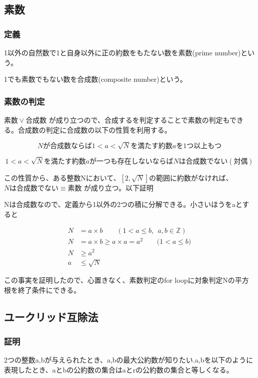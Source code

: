 \documentclass[dvipdfmx]{jsarticle}
\begin{document}
\subsection{素数}

\subsubsection{定義}

1以外の自然数で1と自身以外に正の約数をもたない数を素数(prime number)という。

1でも素数でもない数を合成数(composite number)という。

\subsubsection{素数の判定}

$素数 \lor 合成数$ が成り立つので、合成するを判定することで素数の判定もできる。合成数の判定に合成数の以下の性質を利用する。

\[Nが合成数 ならば 1 < a < \sqrt{N} を満たす約数aを1つ以上もつ\]

\[1 < a < \sqrt{N}を満たす約数aが一つも存在しない ならば　Nは合成数でない(対偶) \]

この性質から、ある整数Nにおいて、$[2, \sqrt{N}]$の範囲に約数がなければ、$Nは合成数でない \equiv 素数$ が成り立つ。以下証明

Nは合成数なので、定義から1以外の2つの積に分解できる。小さいほうをaとすると

\begin{align*}
  N &= a \times b \qquad ( 1 < a \leq b, \ \ a, b \in\mathbb{Z}) \\
  N &= a \times b \geq a \times a = a^2 \qquad \text{($1 < a \leq b $)} \\
  N &\geq a^2 \\
  a &\leq \sqrt{N}
\end{align*}

この事実を証明したので、心置きなく、素数判定のfor loopに対象判定Nの平方根を終了条件にできる。

\subsection{ユークリッド互除法}

\subsubsection{証明}

2つの整数a,bが与えられたとき、a,bの最大公約数が知りたい.a,bを以下のように表現したとき、aとbの公約数の集合はaとrの公約数の集合と等しくなる。
\end{document}
